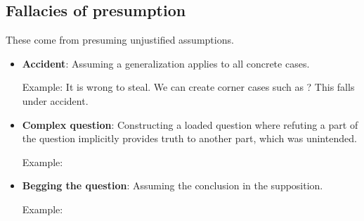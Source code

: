 \documentclass[5pt]{book}
\begin{document}
\subsection{Fallacies of presumption}
These come from presuming unjustified assumptions.
\begin{itemize}
    \item \textbf{Accident}: Assuming a generalization applies to all concrete
        cases. 

        Example: It is wrong to steal. We can create corner cases such as 
        ? This falls under accident.

    \item \textbf{Complex question}: Constructing a loaded question where
        refuting a part of the question implicitly provides truth to another
        part, which was unintended.

        Example: 

    \item \textbf{Begging the question}: Assuming the conclusion in the 
        supposition.

        Example: 
\end{itemize}
\end{document}
